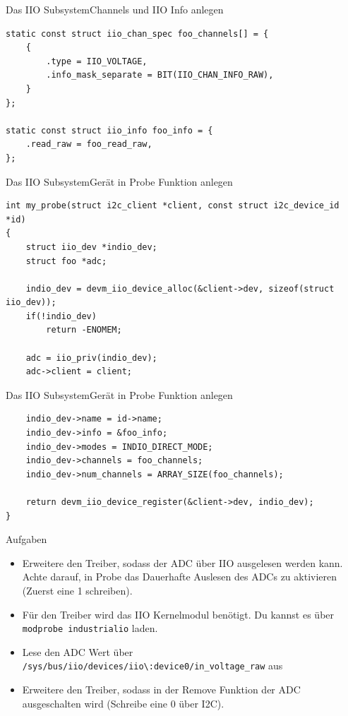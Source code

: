 \documentclass[aspectratio=169]{beamer}
\begin{document}
\begin{frame}[fragile]{Das IIO Subsystem}{Channels und IIO Info anlegen}
	\begin{lstlisting}
static const struct iio_chan_spec foo_channels[] = {
	{
		.type = IIO_VOLTAGE,
		.info_mask_separate = BIT(IIO_CHAN_INFO_RAW),
	}
};

static const struct iio_info foo_info = {
	.read_raw = foo_read_raw,
};
	\end{lstlisting}
\end{frame}

\begin{frame}[fragile]{Das IIO Subsystem}{Gerät in Probe Funktion anlegen}
	\begin{lstlisting}
int my_probe(struct i2c_client *client, const struct i2c_device_id *id)
{
	struct iio_dev *indio_dev;
	struct foo *adc;

	indio_dev = devm_iio_device_alloc(&client->dev, sizeof(struct iio_dev));
	if(!indio_dev)
		return -ENOMEM;

	adc = iio_priv(indio_dev);
	adc->client = client;
	\end{lstlisting}
\end{frame}

\begin{frame}[fragile]{Das IIO Subsystem}{Gerät in Probe Funktion anlegen}
	\begin{lstlisting}
	indio_dev->name = id->name;
	indio_dev->info = &foo_info;
	indio_dev->modes = INDIO_DIRECT_MODE;
	indio_dev->channels = foo_channels;
	indio_dev->num_channels = ARRAY_SIZE(foo_channels);

	return devm_iio_device_register(&client->dev, indio_dev);
}
	\end{lstlisting}
\end{frame}

\begin{frame}{Aufgaben}
	\begin{itemize}
		\item Erweitere den Treiber, sodass der ADC über IIO ausgelesen werden kann. Achte darauf, in Probe das Dauerhafte Auslesen des ADCs zu aktivieren (Zuerst eine 1 schreiben).
		\item Für den Treiber wird das IIO Kernelmodul benötigt. Du kannst es über \lstinline|modprobe industrialio| laden.
		\item Lese den ADC Wert über \lstinline|/sys/bus/iio/devices/iio\:device0/in_voltage_raw| aus
		\item Erweitere den Treiber, sodass in der Remove Funktion der ADC ausgeschalten wird (Schreibe eine 0 über I2C).
	\end{itemize}
\end{frame}
\end{document}

